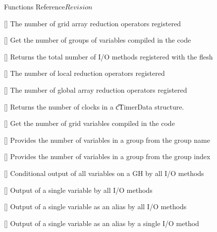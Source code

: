 \begin{cactuspart}{ Functions Reference}{}{$Revision$}
\begin{Lentry}
\item[\code{CCTK\_NumGridArrayReductionOperators}] [\pageref{CCTK-NumGridArrayReductionOperators}]
  The number of grid array reduction operators registered

\item[\code{CCTK\_NumGroups}] [\pageref{CCTK-NumGroups}]
  Get the number of groups of variables compiled in the code

\item[\code{CCTK\_NumIOMethods}] [\pageref{CCTK-NumIOMethods}]
  Returns the total number of I/O methods registered with the flesh

\item[\code{CCTK\_NumLocalArrayReduceOperators}] [\pageref{CCTK-NumLocalArrayReduceOperators}]
  The number of local reduction operators registered

\item[\code{CCTK\_NumReductionArraysGloballyOperators}] [\pageref{CCTK-NumReductionArraysGloballyOperators}]
  The number of global array reduction operators registered

\item[\code{CCTK\_NumTimerClocks}] [\pageref{CCTK-NumTimerClocks}]
  Returns the number of clocks in a {\t cTimerData} structure.

\item[\code{CCTK\_NumVars}] [\pageref{CCTK-NumVars}]
  Get the number of grid variables compiled in the code

\item[\code{CCTK\_NumVarsInGroup}] [\pageref{CCTK-NumVarsInGroup}]
  Provides the number of variables in a group from the group name

\item[\code{CCTK\_NumVarsInGroupI}] [\pageref{CCTK-NumVarsInGroupI}]
  Provides the number of variables in a group from the group index

\item[\code{CCTK\_OutputGH}] [\pageref{CCTK-OutputGH}]
  Conditional output of all variables on a GH by all I/O methods

\item[\code{CCTK\_OutputVar}] [\pageref{CCTK-OutputVar}]
  Output of a single variable by all I/O methods

\item[\code{CCTK\_OutputVarAs}] [\pageref{CCTK-OutputVarAs}]
  Output of a single variable as an alias by all I/O methods

\item[\code{CCTK\_OutputVarAsByMethod}] [\pageref{CCTK-OutputVarAsByMethod}]
  Output of a single variable as an alias by a single I/O method


\end{Lentry}
\end{cactuspart}
